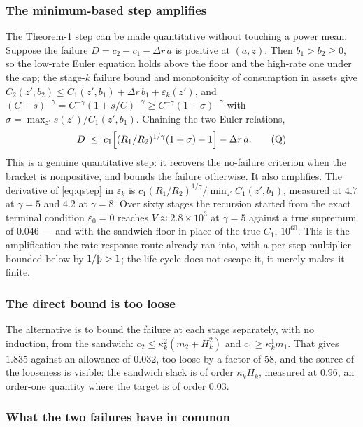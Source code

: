 \subsubsection*{The minimum-based step amplifies}

The Theorem-1 step can be made quantitative without touching a power mean. Suppose the failure
$D=c_2-c_1-\Delta r\,a$ is positive at $(a,z)$. Then $b_1>b_2\ge0$, so the low-rate Euler equation
holds above the floor and the high-rate one under the cap; the stage-$k$ failure bound and
monotonicity of consumption in assets give $C_2(z',b_2)\le C_1(z',b_1)+\Delta r\,b_1+\varepsilon_k(z')$,
and $(C+s)^{-\gamma}=C^{-\gamma}(1+s/C)^{-\gamma}\ge C^{-\gamma}(1+\sigma)^{-\gamma}$ with
$\sigma=\max_{z'}s(z')/C_1(z',b_1)$. Chaining the two Euler relations,
\begin{equation}\label{eq:qstep}
  D\;\le\;c_1\Bigl[(R_1/R_2)^{1/\gamma}(1+\sigma)-1\Bigr]-\Delta r\,a .
  \tag{Q}
\end{equation}
This is a genuine quantitative step: it recovers the no-failure criterion when the bracket is
nonpositive, and bounds the failure otherwise. It also amplifies. The derivative of \eqref{eq:qstep}
in $\varepsilon_k$ is $c_1(R_1/R_2)^{1/\gamma}/\min_{z'}C_1(z',b_1)$, measured at $4.7$ at
$\gamma=5$ and $4.2$ at $\gamma=8$. Over sixty stages the recursion started from the exact terminal
condition $\varepsilon_0=0$ reaches $V\approx2.8\times10^{3}$ at $\gamma=5$ against a true supremum of
$0.046$ --- and with the sandwich floor in place of the true $C_1$, $10^{60}$. This is the
amplification the rate-response route already ran into, with a per-step multiplier bounded below by
$1/\Thorn>1$; the life cycle does not escape it, it merely makes it finite.

\subsubsection*{The direct bound is too loose}

The alternative is to bound the failure at each stage separately, with no induction, from the
sandwich: $c_2\le\kappa^2_{k}(m_2+H^2_{k})$ and $c_1\ge\kappa^1_{k}m_1$. That gives $1.835$ against
an allowance of $0.032$, too loose by a factor of $58$, and the source of the looseness is visible:
the sandwich slack is of order $\kappa_kH_k$, measured at $0.96$, an order-one quantity where the
target is of order $0.03$.

\subsubsection*{What the two failures have in common}

